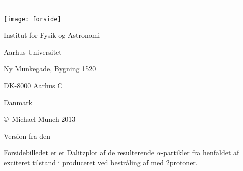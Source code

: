 \begin{titlingpage}
  \thispagestyle{empty}
  \calccentering{\unitlength} %
  \begin{adjustwidth*}{\unitlength}{-\unitlength}
    \begin{adjustwidth}{-1cm}{-1cm}
      \centering
      { \setlength{\baselineskip}{24pt}
        {\Huge {} \par
        }\par
        \par\vspace*{4\onelineskip}
        \par
        \texttt{[image: forside]} 
        \par\vspace*{4\onelineskip}
        \par
        \large{}\par
      }
      \vfill
      \vspace*{2\onelineskip}
      \hfill
      \par\vspace*{2\onelineskip}
      \small
      \par
      \enlargethispage{2\onelineskip}
    \end{adjustwidth}
  \end{adjustwidth*}
  \newpage
  \thispagestyle{empty} %
  \small
  \strut\vfill  %
  \begin{flushleft}
    Institut for Fysik og Astronomi \par
    Aarhus Universitet \par
    Ny Munkegade, Bygning 1520 \par
    DK-8000 Aarhus C \par
    Danmark \par
    \vspace{\onelineskip}
    
    \copyright\ Michael Munch 2013 \par
    Version \gitid fra den  \gittime\par
    \vspace{\onelineskip}
    Forsidebilledet er et Dalitzplot af de resulterende $\alpha$-partikler fra henfaldet af exciteret
    tilstand i \Carb produceret ved bestråling af \Bor med 2\MeV protoner.
  \end{flushleft}
\end{titlingpage}